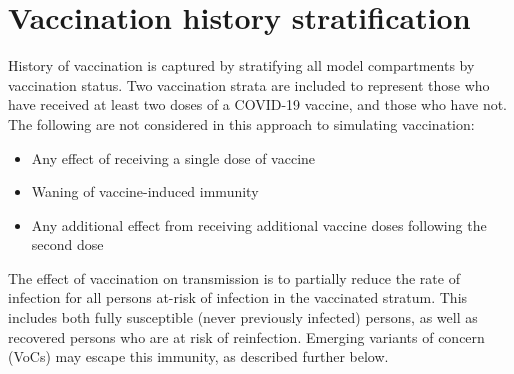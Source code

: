 \section{Vaccination history stratification}
History of vaccination is captured by stratifying all model compartments by vaccination status.
Two vaccination strata are included to represent those who have received at least two doses of a COVID-19 vaccine,
and those who have not.
The following are not considered in this approach to simulating vaccination:
\begin{itemize}
    \item Any effect of receiving a single dose of vaccine
    \item Waning of vaccine-induced immunity
    \item Any additional effect from receiving additional vaccine doses following the second dose
\end{itemize}
The effect of vaccination on transmission is to partially reduce the rate of infection for all persons at-risk of infection in the vaccinated stratum.
This includes both fully susceptible (never previously infected) persons,
as well as recovered persons who are at risk of reinfection.
Emerging variants of concern (VoCs) may escape this immunity, as described further below.
